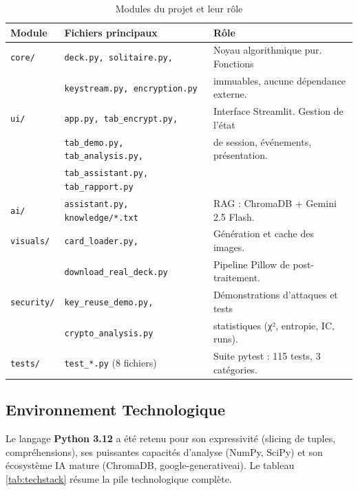 \documentclass[12pt,a4paper]{article}
\begin{document}
\begin{table}[H]
\centering
\caption{Modules du projet et leur rôle}
\begin{tabularx}{\textwidth}{llX}
\toprule
\textbf{Module} & \textbf{Fichiers principaux} & \textbf{Rôle} \\
\midrule
\texttt{core/} & \texttt{deck.py, solitaire.py,} & Noyau algorithmique pur. Fonctions \\
 & \texttt{keystream.py, encryption.py} & immuables, aucune dépendance externe. \\
\addlinespace
\texttt{ui/} & \texttt{app.py, tab\_encrypt.py,} & Interface Streamlit. Gestion de l'état \\
 & \texttt{tab\_demo.py, tab\_analysis.py,} & de session, événements, présentation. \\
 & \texttt{tab\_assistant.py, tab\_rapport.py} & \\
\addlinespace
\texttt{ai/} & \texttt{assistant.py, knowledge/*.txt} & RAG : ChromaDB + Gemini 2.5 Flash. \\
\addlinespace
\texttt{visuals/} & \texttt{card\_loader.py,} & Génération et cache des images. \\
 & \texttt{download\_real\_deck.py} & Pipeline Pillow de post-traitement. \\
\addlinespace
\texttt{security/} & \texttt{key\_reuse\_demo.py,} & Démonstrations d'attaques et tests \\
 & \texttt{crypto\_analysis.py} & statistiques (χ², entropie, IC, runs). \\
\addlinespace
\texttt{tests/} & \texttt{test\_*.py} (8 fichiers) & Suite pytest : 115 tests, 3 catégories. \\
\bottomrule
\end{tabularx}
\label{tab:modules}
\end{table}

\subsection{Environnement Technologique}
Le langage \textbf{Python 3.12} a été retenu pour son expressivité (slicing de tuples, compréhensions), ses puissantes capacités d'analyse (NumPy, SciPy) et son écosystème IA mature (ChromaDB, google-generativeai). Le tableau \ref{tab:techstack} résume la pile technologique complète.
\end{document}
